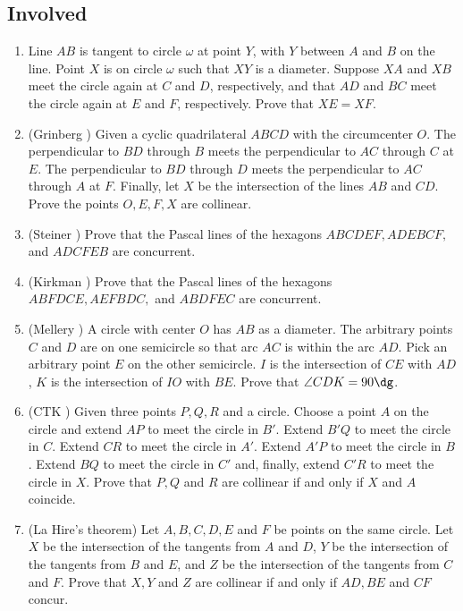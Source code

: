 \documentclass[11pt,paper=letter]{scrartcl}
\begin{document}
\subsection{Involved}

\begin{enumerate}

\item Line $AB$ is tangent to circle $\omega$ at point $Y$, with $Y$ between $A$ and $B$ on the line. Point $X$ is on circle $\omega$ such that $XY$ is a diameter. Suppose $XA$ and $XB$ meet the circle again at $C$ and $D$, respectively, and that $AD$ and $BC$ meet the circle again at $E$ and $F$, respectively. Prove that $XE = XF$.

\item (Grinberg \cite{CTK3}) Given a cyclic quadrilateral $ABCD$ with the circumcenter $O$. The perpendicular to $BD$ through $B$ meets the perpendicular to $AC$ through $C$ at $E$. The perpendicular to $BD$ through $D$ meets the perpendicular to $AC$ through $A$ at $F$. Finally, let $X$ be the intersection of the lines $AB$ and $CD$. Prove the points $O, E, F, X$ are collinear.

\item (Steiner \cite{CTK1}) Prove that the Pascal lines of the hexagons $ABCDEF, ADEBCF,$ and $ADCFEB$ are concurrent.

\item (Kirkman \cite{CTK1}) Prove that the Pascal lines of the hexagons $ABFDCE, AEFBDC,$ and $ABDFEC$ are concurrent.

\item (Mellery \cite{CTK9}) A circle with center $O$ has $AB$ as a diameter. The arbitrary points $C$ and $D$ are on one semicircle so that arc $AC$ is within the arc $AD$. Pick an arbitrary point $E$ on the other semicircle. $I$ is the intersection of $CE$ with $AD$, $K$ is the intersection of $IO$ with $BE$. Prove that $\angle CDK = 90\dg$.

\item (CTK \cite{CTK5}) Given three points $P, Q, R$ and a circle. Choose a point $A$ on the circle and extend $AP$ to meet the circle in $B'$. Extend $B'Q$ to meet the circle in $C$. Extend $CR$ to meet the circle in $A'$. Extend $A'P$ to meet the circle in $B$. Extend $BQ$ to meet the circle in $C'$ and, finally, extend $C'R$ to meet the circle in $X$. Prove that $P, Q$ and $R$ are collinear if and only if $X$ and $A$ coincide.

\item (La Hire's theorem) Let $A, B, C, D, E$ and $F$ be points on the same circle. Let $X$ be the intersection of the tangents from $A$ and $D$, $Y$ be the intersection of the tangents from $B$ and $E$, and $Z$ be the intersection of the tangents from $C$ and $F$. Prove that $X, Y$ and $Z$ are collinear if and only if $AD, BE$ and $CF$ concur.

\end{enumerate}
\end{document}
